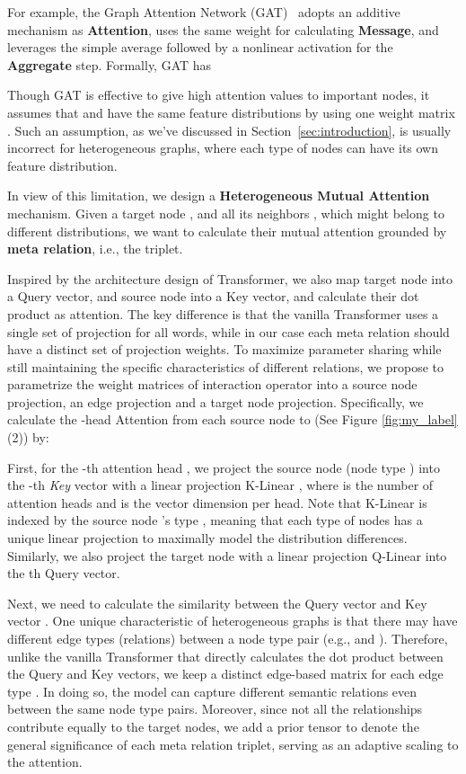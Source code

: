 \documentclass[sigconf]{acmart}
\theoremstyle{definition}
\begin{document}
{For example, the Graph Attention Network (GAT)~\cite{DBLP:conf/iclr/VelickovicCCRLB18} adopts an additive mechanism as \textbf{Attention}, uses the same weight for calculating \textbf{Message}, and leverages the simple average followed by a nonlinear activation for the \textbf{Aggregate} step. 
Formally, GAT has

Though GAT is effective to give high attention values to important nodes, it assumes that  and  have the same feature distributions by using one weight matrix . 
Such an assumption, as we've discussed in Section~\ref{sec:introduction}, 
is usually incorrect for heterogeneous graphs, where each type of nodes can have its own feature distribution. 


In view of this limitation, we design a \textbf{Heterogeneous Mutual Attention} mechanism. 
Given a target node , and all its neighbors , which might belong to different distributions, we want to calculate their mutual attention grounded by \textbf{meta relation}, i.e., the  triplet. 

Inspired by the architecture design of Transformer, we also map target node  into a Query vector, and source node  into a Key vector, and calculate their dot product as attention. The key difference is that the vanilla Transformer uses a single set of projection for all words, while in our case each meta relation should have a distinct set of projection weights. To maximize parameter sharing while still maintaining the specific characteristics of different relations, we propose to parametrize the weight matrices of interaction operator into a source node projection, an edge projection and a target node projection. Specifically, we calculate the -head {Attention} from each source node  to  (See Figure \ref{fig:my_label} (2)) by:

First, for the -th attention head , we project the source node  (node type ) into the -th \textit{Key} vector  with a linear projection K-Linear , where  is the number of attention heads and  is the vector dimension per head. 
Note that K-Linear is indexed by the source node 's type , meaning that each type of nodes has a unique linear projection to maximally model the distribution differences. 
Similarly, we also project the target node  with a linear projection Q-Linear into the th Query vector. 



Next, we need to calculate the similarity between the Query vector  and Key vector . 
One unique characteristic of heterogeneous graphs is that there may have different edge types (relations) between a node type pair (e.g.,  and ). 
Therefore, unlike the vanilla Transformer that directly calculates the dot product between the Query and Key vectors, we keep a distinct edge-based matrix  for each edge type . In doing so, the model can capture different semantic relations even between the same node type pairs. 
Moreover, since not all the relationships contribute equally to the target nodes, 
we add a prior tensor  to denote the general significance of each meta relation triplet, serving as an adaptive scaling to the attention. 

}
\end{document}
